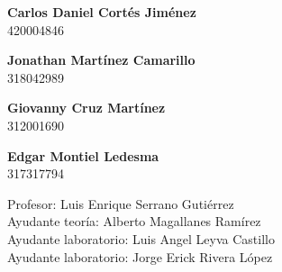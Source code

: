 \begin{titlepage}
    \vspace{5mm}
        
    \begin{minipage}{0.4\textwidth}
            \textbf{\large{Carlos Daniel Cortés Jiménez}}\\    
                420004846        
    \end{minipage}
    \begin{minipage}{0.4\textwidth}
        \begin{flushright}
            \textbf{\large{Jonathan Martínez Camarillo}}\\
                318042989
        \end{flushright}
    \end{minipage}
    
    \vspace{5mm}

    \begin{minipage}{0.4\textwidth}
        \textbf{\large{Giovanny Cruz Martínez}}\\
                312001690
    \end{minipage}
    \begin{minipage}{0.4\textwidth}
        \begin{flushright}
            \textbf{\large{Edgar Montiel Ledesma}}\\
                317317794       
        \end{flushright}
    \end{minipage}

    \vspace{5mm}
    
    
    \begin{minipage}{0.8\textwidth}
        \begin{flushleft} \large
            Profesor: Luis Enrique Serrano Gutiérrez \\
            Ayudante teoría: Alberto Magallanes Ramírez \\
            Ayudante laboratorio: Luis Angel Leyva Castillo \\
            Ayudante laboratorio: Jorge Erick Rivera López \\                    
        \end{flushleft}
    \end{minipage}
    
    \vspace{20mm}
    

\end{titlepage}
